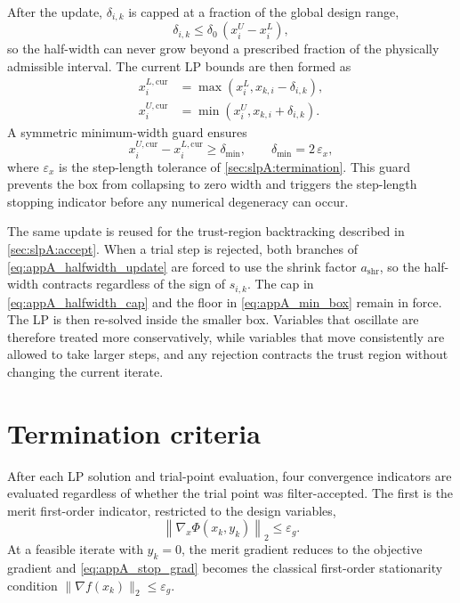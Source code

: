 After the update, $\delta_{i,k}$ is capped at a fraction of the
global design range,
\begin{equation}
\label{eq:appA_halfwidth_cap}
    \delta_{i,k}
    \leq
    \delta_0\,\left(x_i^U-x_i^L\right) ,
\end{equation}
so the half-width can never grow beyond a prescribed fraction of the
physically admissible interval. The current LP bounds are then formed
as
\begin{equation}
\label{eq:appA_current_bounds}
\begin{aligned}
    x_i^{L,\mathrm{cur}}
    &=
    \max\left(x_i^L, x_{k,i}-\delta_{i,k}\right),
    \\
    x_i^{U,\mathrm{cur}}
    &=
    \min\left(x_i^U, x_{k,i}+\delta_{i,k}\right) .
\end{aligned}
\end{equation}
A symmetric minimum-width guard ensures
\begin{equation}
\label{eq:appA_min_box}
    x_i^{U,\mathrm{cur}}-x_i^{L,\mathrm{cur}} \geq \delta_{\min},
    \qquad
    \delta_{\min} = 2\,\varepsilon_x ,
\end{equation}
where $\varepsilon_x$ is the step-length tolerance of
\autoref{sec:slpA:termination}. This guard prevents the box from
collapsing to zero width and triggers the step-length stopping
indicator before any numerical degeneracy can occur.

The same update is reused for the trust-region backtracking described
in \autoref{sec:slpA:accept}. When a trial step is rejected, both
branches of \autoref{eq:appA_halfwidth_update} are forced to use the
shrink factor $a_{\mathrm{shr}}$, so the half-width contracts
regardless of the sign of $s_{i,k}$. The cap in
\autoref{eq:appA_halfwidth_cap} and the floor in
\autoref{eq:appA_min_box} remain in force. The LP is then re-solved
inside the smaller box. Variables that oscillate are therefore
treated more conservatively, while variables that move consistently
are allowed to take larger steps, and any rejection contracts the
trust region without changing the current iterate.

\section{Termination criteria}
\label{sec:slpA:termination}

After each LP solution and trial-point evaluation, four convergence
indicators are evaluated regardless of whether the trial point was
filter-accepted. The first is the merit first-order indicator,
restricted to the design variables,
\begin{equation}
\label{eq:appA_stop_grad}
    \left\|\nabla_x\Phi(x_k,y_k)\right\|_2
    \leq
    \varepsilon_g .
\end{equation}
At a feasible iterate with $y_k=0$, the merit gradient reduces to the
objective gradient and \autoref{eq:appA_stop_grad} becomes the
classical first-order stationarity condition
$\|\nabla f(x_k)\|_2\leq\varepsilon_g$.

